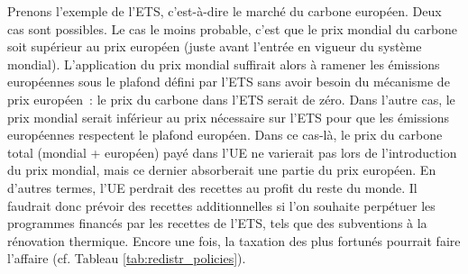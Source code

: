 \documentclass[a5paper,french,openany]{memoir}
\begin{document}
Prenons l'exemple de l'ETS, c'est-à-dire le marché du carbone européen. Deux cas sont possibles. Le cas le moins probable, c'est que le prix mondial du carbone soit supérieur au prix européen (juste avant l'entrée en vigueur du système mondial). L'application du prix mondial suffirait alors à ramener les émissions européennes sous le plafond défini par l'ETS sans avoir besoin du mécanisme de prix européen~: le prix du carbone dans l'ETS serait de zéro. Dans l'autre cas, le prix mondial serait inférieur au prix nécessaire sur l'ETS pour que les émissions européennes respectent le plafond européen. Dans ce cas-là, le prix du carbone total (mondial + européen) payé dans l'UE ne varierait pas lors de l'introduction du prix mondial, mais ce dernier absorberait une partie du prix européen. En d'autres termes, l'UE perdrait des recettes au profit du reste du monde. Il faudrait donc prévoir des recettes additionnelles si l'on souhaite perpétuer les programmes financés par les recettes de l'ETS, tels que des subventions à la rénovation thermique. Encore une fois, la taxation des plus fortunés pourrait faire l'affaire (cf. Tableau \ref{tab:redistr_policies}).





\end{document}
